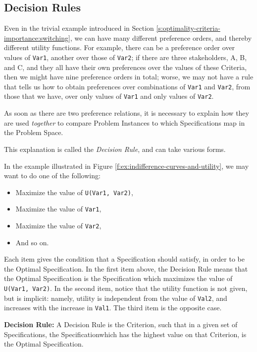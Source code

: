\documentclass[graybox]{svmult}
\newcommand{\zi}[1]{\textit{#1}}
\newcommand{\xb}[1]{\textbf{#1}}
\newcommand{\xt}[1]{\texttt{#1}}
\newcommand{\req}[1]{\xt{#1}}
\newcommand{\ProblemSpace}{Problem Space}
\newcommand{\Specification}{Specification}
\newcommand{\Criterion}{Criterion}
\newcommand{\Criteria}{Criteria}
\newcommand{\ProblemInstance}{Problem Instance}
\newcommand{\OptimalSpecification}{Optimal Specification}
\newcommand{\DecisionRule}{Decision Rule}
\begin{document}
%
\subsection{\DecisionRule s}\label{s:optimal-specifications:decision-rules}
Even in the trivial example introduced in Section \ref{s:optimality-criteria-importance:switching}, we can have many different preference orders, and thereby different utility functions. For example, there can be a preference order over values of \req{Var1}, another over those of \req{Var2}; if there are three stakeholders, A, B, and C, and they all have their own preferences over the values of these \Criteria, then we might have nine preference orders in total; worse, we may not have a rule that tells us how to obtain preferences over combinations of \req{Var1} and \req{Var2}, from those that we have, over only values of \req{Var1} and only values of \req{Var2}.

As soon as there are two preference relations, it is necessary to explain how they are used \zi{together} to compare \ProblemInstance s to which \Specification s map in the \ProblemSpace. 

This explanation is called the \zi{\DecisionRule}, and can take various forms. 

In the example illustrated in Figure \ref{f:ex:indifference-curves-and-utility}, we may want to do one of the following:
\begin{itemize}
    \item{Maximize the value of \req{U(Var1, Var2)},}
    \item{Maximize the value of \req{Var1},}
    \item{Maximize the value of \req{Var2},}
    \item{And so on.}
\end{itemize}

Each item gives the condition that a \Specification{} should satisfy, in order to be the \OptimalSpecification. In the first item above, the \DecisionRule{} means that the \OptimalSpecification{} is the \Specification{} which maximizes the value of \req{U(Var1, Var2)}. In the second item, notice that the utility function is not given, but is implicit: namely, utility is independent from the value of \req{Val2}, and increases with the increase in \req{Val1}. The third item is the opposite case. 

\begin{definition}\label{d:decision-rule}
\xb{\DecisionRule:} A \DecisionRule{} is the \Criterion, such that in a given set of \Specification s, the \Specification which has the highest value on that \Criterion, is the \OptimalSpecification.
\end{definition}
\end{document}
